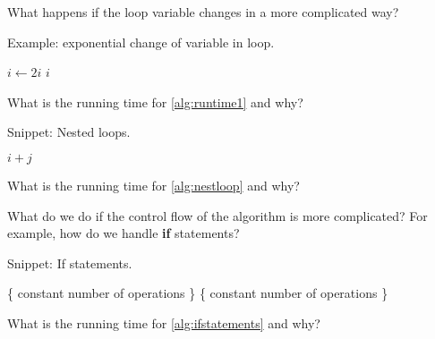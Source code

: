 What happens if the loop variable changes in a more complicated way?

\begin{algorithm}[H]
  \caption{Example: exponential change of variable in loop.}
    \label{alg:runtime1}
\begin{algorithmic}[0]
\State {}
	\State $i \gets 2 i$
	\State {} $i$
\EndWhile
\end{algorithmic}
\end{algorithm}

\begin{Boxample}[4]
What is the running time for \cref{alg:runtime1} and why?
\end{Boxample}

\begin{algorithm}[H]
  \caption{Snippet: Nested loops.}
    \label{alg:nestloop}
\begin{algorithmic}[0]
		\State {} $i+j$
	\EndFor
\EndFor
\end{algorithmic}
\end{algorithm}
\begin{Boxample}[4]
What is the running time for \cref{alg:nestloop} and why?
\end{Boxample}

What do we do if the control flow of the algorithm is more complicated? 
For example, how do we handle \textbf{if} statements?

\begin{algorithm}[H]
  \caption{Snippet: If statements.}
  \label{alg:ifstatements}
\begin{algorithmic}[0]
				\State \{ constant number of operations \} 
			\EndFor
		\Else
				\State \{ constant number of operations \}
			\EndFor
		\EndIf
	\EndFor
\EndFor
\end{algorithmic}
\end{algorithm}
\begin{Boxample}[6]
What is the running time for \cref{alg:ifstatements} and why? 
\end{Boxample}


